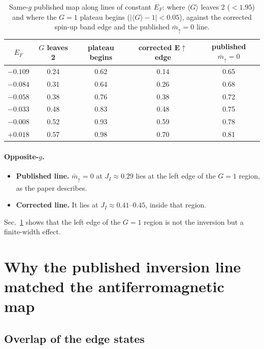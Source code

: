 \documentclass[11pt,a4paper]{article}
\newcommand{\up}{{\uparrow}}
\begin{document}
\begin{table}[t]
\centering
\caption{\label{t:onset}Same-$g$ published map along lines of constant $E_F$: where $\langle G\rangle$ leaves 2
($<1.95$) and where the $G=1$ plateau begins ($|\langle G\rangle-1|<0.05$), against the corrected spin-up
band edge and the published $\bar m_\up=0$ line.}
\begin{tabular}{ccccc}
\toprule
$E_F$ & $G$ leaves 2 & plateau begins & corrected E$\up$ edge & published $\bar m_\up=0$\\
\midrule
$-0.109$ & 0.24 & 0.62 & 0.14 & 0.65\\
$-0.084$ & 0.31 & 0.64 & 0.26 & 0.68\\
$-0.058$ & 0.38 & 0.76 & 0.38 & 0.72\\
$-0.033$ & 0.48 & 0.83 & 0.48 & 0.75\\
$-0.008$ & 0.52 & 0.93 & 0.59 & 0.78\\
$+0.018$ & 0.57 & 0.98 & 0.70 & 0.81\\
\bottomrule
\end{tabular}
\end{table}

\paragraph{Opposite-$g$.}
\begin{itemize}
\item \textbf{Published line.} $\bar m_\up=0$ at $J_I\approx0.29$ lies at the left edge of the
  $G=1$ region, as the paper describes.
\item \textbf{Corrected line.} It lies at $J_I\approx0.41$--$0.45$, inside that region.
\end{itemize}
Sec.~\ref{s:width} shows that the left edge of the $G=1$ region is not the inversion but a
finite-width effect.

\section{Why the published inversion line matched the antiferromagnetic map}\label{s:width}

\subsection{Overlap of the edge states}
\end{document}
